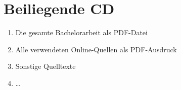 
\chapter{Beiliegende CD}
\label{cha:BeiliegendeCd}

\begin{enumerate}
	\item Die gesamte Bachelorarbeit als PDF-Datei
	\item Alle verwendeten Online-Quellen als PDF-Ausdruck
	\item Sonstige Quelltexte
	\item \ldots
\end{enumerate}